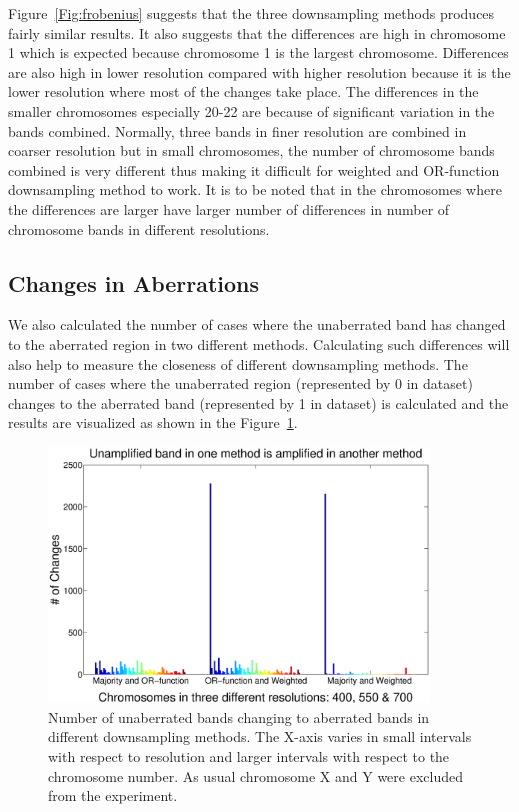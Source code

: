 Figure~\ref{Fig:frobenius} suggests that the three downsampling methods produces fairly similar results. It also suggests that the differences are high in chromosome 1 which is expected because chromosome 1 is the largest chromosome. Differences are also high in lower resolution compared with higher resolution because it is the lower resolution where most of the changes take place. The differences in the smaller chromosomes especially 20-22 are because of significant variation in the bands combined. Normally, three bands in finer resolution are combined in coarser resolution but in small chromosomes, the number of chromosome bands combined is very different thus making it difficult for weighted and OR-function downsampling method to work. It is to be noted that in the chromosomes where the differences are larger have larger number of differences in number of chromosome bands in different resolutions. 

\subsection{Changes in Aberrations}
\label{ss:chinaberrations}
We also calculated the number of cases where the unaberrated band has changed to the aberrated region in two different methods. Calculating such differences will also help to measure the closeness of different downsampling methods. The number of cases where the unaberrated region (represented by 0 in dataset) changes to the aberrated band (represented by 1 in dataset) is calculated and the results are visualized as shown in the Figure~\ref{Fig:0to1hist}.
\begin{figure}[h!]
\centering
\includegraphics[width=0.9\textwidth]{figures/0to1changes1}
\caption[Number of \mbox{0-1} changes]{Number of unaberrated bands changing to aberrated bands in different downsampling methods. The X-axis varies in small intervals with respect to resolution and larger intervals with respect to the chromosome number. As usual chromosome X and Y were excluded from the experiment.}\label{Fig:0to1hist}
\end{figure}

